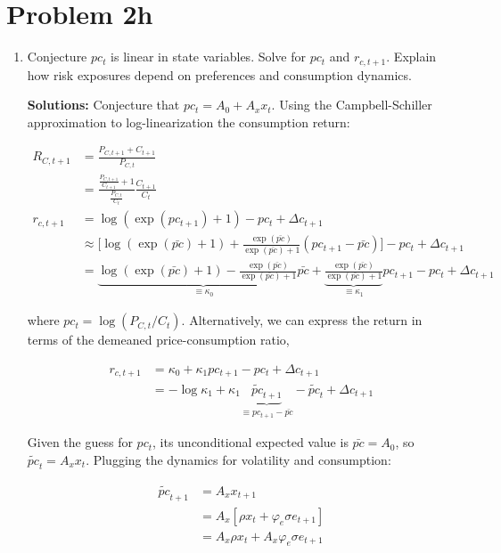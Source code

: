 \documentclass{article}
\begin{document}
\pagebreak

\section{Problem 2h}

\begin{enumerate}

\item Conjecture $pc_t$ is linear in state variables. Solve for $pc_t$ and $r_{c,t+1}$. Explain how risk exposures depend on preferences and consumption dynamics.

\bigskip

\textbf{Solutions:} Conjecture that $pc_t = A_0 + A_x x_t$. 
Using the Campbell-Schiller approximation to log-linearization the consumption return:

\begin{align*}
R_{C,t+1} 
&= \frac{P_{C,t+1} + C_{t+1}}{P_{C,t}} \\
&=  \frac{\frac{P_{C,t+1}}{C_{t+1}} + 1}{\frac{P_{C,t}}{C_t}} \frac{C_{t+1}}{C_{t}}\\
r_{c,t+1} 
&= \log(\exp(pc_{t+1}) +1) - pc_t +\Delta c_{t+1} \\
&\approx \Bigg[\log(\exp(\bar{pc}) +1) + \frac{\exp(\bar{pc})}{\exp(\bar{pc}) + 1} (pc_{t+1} - \bar{pc})\Bigg]- pc_t +\Delta c_{t+1} \\
&= \underbrace{\log(\exp(\bar{pc}) +1)- \frac{\exp(\bar{pc})}{\exp(\bar{pc}) + 1} \bar{pc}}_{\equiv \kappa_0} + \underbrace{\frac{\exp(\bar{pc})}{\exp(\bar{pc}) + 1}}_{\equiv \kappa_1} pc_{t+1} - pc_t +\Delta c_{t+1} 
\end{align*}

where $pc_t = \log(P_{C,t}/C_{t})$. Alternatively, we can express the return in terms of the demeaned price-consumption ratio,

\begin{align*}
r_{c, t+1} 
&= \kappa_0 + \kappa_1 pc_{t+1} - pc_t + \Delta c_{t+1}\\
&= -\log \kappa_1 + \kappa_1 \underbrace{\tilde{pc}_{t+1}}_{\equiv pc_{t+1} - \bar{pc}} - \tilde{pc}_t + \Delta c_{t+1}
\end{align*}

Given the guess for $pc_t$, its unconditional expected value is $\bar{pc} = A_0$, so $\tilde{pc}_t = A_x x_t$. Plugging the dynamics for volatility and consumption:

\begin{align*}
\tilde{pc}_{t+1} 
&= A_x x_{t+1} \\
&= A_x [\rho x_t + \varphi_e \sigma e_{t+1}] \\
&= A_x \rho x_t  + A_x \varphi_e \sigma e_{t+1}  
\end{align*}


\end{enumerate}
\end{document}
